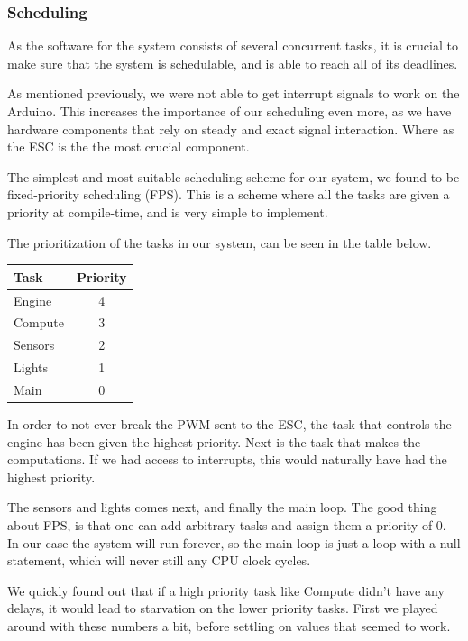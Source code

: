 \documentclass{article}
\begin{document}
\subsubsection{Scheduling}
As the software for the system consists of several concurrent tasks, it is crucial to make sure that the system is schedulable, and is able to reach all of its deadlines.

As mentioned previously, we were not able to get interrupt signals to work on the Arduino. This increases the importance of our scheduling even more, as we have hardware components that rely on steady and exact signal interaction. Where as the ESC is the the most crucial component.

The simplest and most suitable scheduling scheme for our system, we found to be fixed-priority scheduling (FPS). This is a scheme where all the tasks are given a priority at compile-time, and is very simple to implement.

The prioritization of the tasks in our system, can be seen in the table below.

\begin{center}
 \begin{tabular}{||l c||}
 \hline
 Task & Priority \\ [0.5ex]
 \hline\hline
   Engine & 4 \\
 \hline
   Compute & 3 \\
 \hline
   Sensors & 2 \\
 \hline
   Lights & 1 \\
 \hline
   Main & 0 \\ [1ex]
 \hline
\end{tabular}
\end{center}

In order to not ever break the PWM sent to the ESC, the task that controls the engine has been given the highest priority. Next is the task that makes the computations. If we had access to interrupts, this would naturally have had the highest priority.

The sensors and lights comes next, and finally the main loop. The good thing about FPS, is that one can add arbitrary tasks and assign them a priority of 0. In our case the system will run forever, so the main loop is just a loop with a null statement, which will never still any CPU clock cycles.

We quickly found out that if a high priority task like Compute didn't have any delays, it would lead to starvation on the lower priority tasks. First we played around with these numbers a bit, before settling on values that seemed to work.
\end{document}
